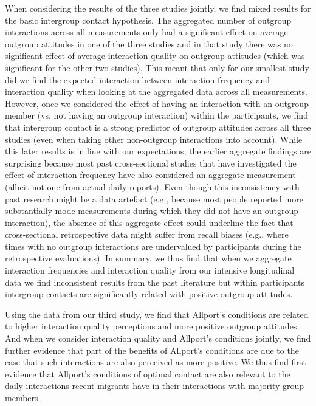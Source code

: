 \documentclass[man, 12pt, a4paper]{apa7}
\theoremstyle{break}
\theoremstyle{plain}
\begin{document}
When considering the results of the three studies jointly, we find mixed results for the basic intergroup contact hypothesis. The aggregated number of outgroup interactions across all measurements only had a significant effect on average outgroup attitudes in one of the three studies and in that study there was no significant effect of average interaction quality on outgroup attitudes (which was significant for the other two studies). This meant that only for our smallest study did we find the expected interaction between interaction frequency and interaction quality when looking at the aggregated data across all measurements. However, once we considered the effect of having an interaction with an outgroup member (vs. not having an outgroup interaction) within the participants, we find that intergroup contact is a strong predictor of outgroup attitudes across all three studies (even when taking other non-outgroup interactions into account). While this later results is in line with our expectations, the earlier aggregate findings are surprising because most past cross-sectional studies that have investigated the effect of interaction frequency have also considered an aggregate measurement (albeit not one from actual daily reports). Even though this inconsistency with past research might be a data artefact (e.g., because most people reported more substantially mode measurements during which they did not have an outgroup interaction), the absence of this aggregate effect could underline the fact that cross-sectional retrospective data might suffer from recall biases (e.g., where times with no outgroup interactions are undervalued by participants during the retrospective evaluations). In summary, we thus find that when we aggregate interaction frequencies and interaction quality from our intensive longitudinal data we find inconsistent results from the past literature but within participants intergroup contacts are significantly related with positive outgroup attitudes.

Using the data from our third study, we find that Allport's conditions are related to higher interaction quality perceptions and more positive outgroup attitudes. And when we consider interaction quality and Allport's conditions jointly, we find further evidence that part of the benefits of Allport's conditions are due to the case that such interactions are also perceived as more positive. We thus find first evidence that Allport's conditions of optimal contact are also relevant to the daily interactions recent migrants have in their interactions with majority group members. 
\end{document}
